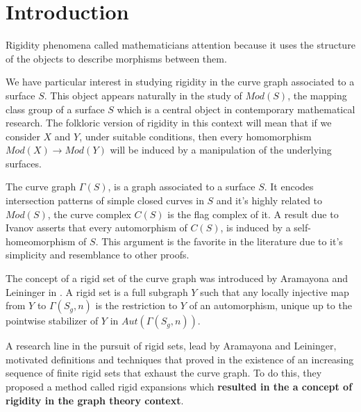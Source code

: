 \chapter*{Introduction} %

\label{Intro} %



Rigidity phenomena called mathematicians attention because it uses the structure of the objects to describe morphisms between them. 

We have particular interest in studying rigidity in the curve graph associated to a surface $S$. This object appears naturally in the study of $Mod(S)$, the mapping class group of a surface $S$ which is a central object in contemporary mathematical research. The folkloric version of rigidity in this context will mean that if we consider $X$ and $Y$, under suitable conditions, then every homomorphism $Mod(X) \to Mod(Y)$ will be induced by a manipulation of the underlying surfaces.

The curve graph $\Gamma(S)$, is a graph associated to a surface $S$. It encodes intersection patterns of simple closed curves in $S$ and it's highly related to $Mod(S)$, the curve complex $C(S)$ is the flag complex of it. A result due to Ivanov asserts that every automorphism of $C(S)$, is induced by a self-homeomorphism of $S$. This argument is the favorite in the literature due to it's simplicity and resemblance to other proofs.

The concept of a rigid set of the curve graph was introduced by Aramayona and Leininger in \cite[Aramayona, Leininger - 13]{finiteRigidSetsJA}. A rigid set is a full subgraph $Y$ such that any locally injective map from $Y$ to $\Gamma(S_{g},n)$ is the restriction to $Y$ of an automorphism, unique up to the pointwise stabilizer of $Y$ in $Aut(\Gamma(S_{g},n))$.

A research line in the pursuit of rigid sets, lead by Aramayona and Leininger, motivated definitions and techniques that proved in \cite[Aramayona, Leininger - 16]{exhaustionByRigidSets} the existence of an increasing sequence of finite rigid sets that exhaust the curve graph. To do this, they proposed a method called rigid expansions which \textbf{resulted in the a concept of rigidity in the graph theory context}.

